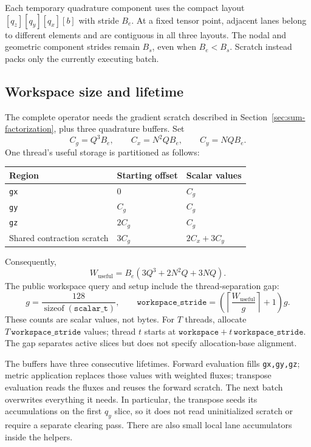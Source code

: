 \documentclass[11pt]{article}
\begin{document}
Each temporary quadrature component uses the compact layout
\([q_z][q_y][q_x][b]\) with stride \(B_e\). At a fixed tensor point, adjacent
lanes belong to different elements and are contiguous in all three layouts.
The nodal and geometric component strides remain \(B_s\), even when
\(B_e<B_s\). Scratch instead packs only the currently executing batch.

\subsection{Workspace size and lifetime}

The complete operator needs the gradient scratch described in
Section~\ref{sec:sum-factorization}, plus three quadrature buffers.
Set
\[
 C_g=Q^3B_e,\qquad C_x=N^2QB_e,\qquad C_y=NQB_e.
\]
One thread's useful storage is partitioned as follows:
\begin{center}
\begin{tabular}{lll}
\toprule
Region & Starting offset & Scalar values\\
\midrule
\texttt{gx} & \(0\) & \(C_g\)\\
\texttt{gy} & \(C_g\) & \(C_g\)\\
\texttt{gz} & \(2C_g\) & \(C_g\)\\
Shared contraction scratch & \(3C_g\) & \(2C_x+3C_y\)\\
\bottomrule
\end{tabular}
\end{center}
Consequently,
\[
 W_{\mathrm{useful}}
 =B_e(3Q^3+2N^2Q+3NQ).
\]
The public workspace query and setup include the thread-separation gap:
\[
 g=\frac{128}{\operatorname{sizeof}(\texttt{scalar\_t})},
 \qquad
 \texttt{workspace\_stride}
 =\left(\left\lceil\frac{W_{\mathrm{useful}}}{g}\right\rceil+1\right)g.
\]
These counts are scalar values, not bytes. For \(T\) threads, allocate
\(T\,\texttt{workspace\_stride}\) values; thread \(t\) starts at
\(\texttt{workspace}+t\,\texttt{workspace\_stride}\).
The gap separates active slices but does not specify allocation-base alignment.

The buffers have three consecutive lifetimes. Forward evaluation fills
\texttt{gx,gy,gz}; metric application replaces those values with weighted
fluxes; transpose evaluation reads the fluxes and reuses the forward scratch.
The next batch overwrites everything it needs. In particular, the transpose
seeds its accumulations on the first \(q_y\) slice, so it does not read
uninitialized scratch or require a separate clearing pass.
There are also small local lane accumulators inside the helpers.
\end{document}
